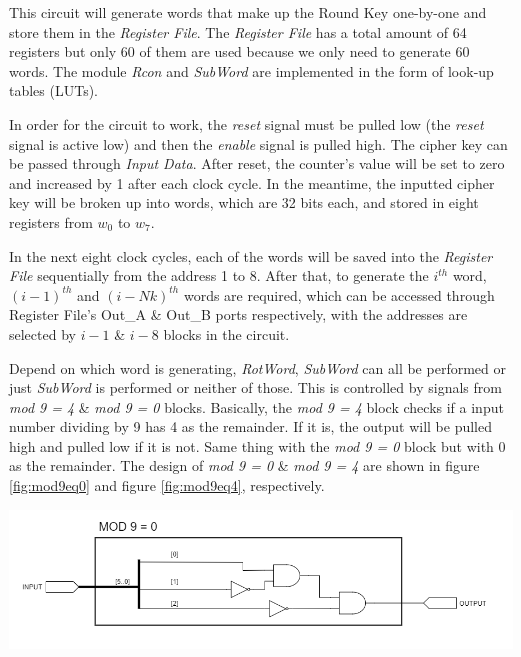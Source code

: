 \documentclass[a4paper, 10pt]{article}
\newenvironment{Figure}
    {\par\medskip\noindent\minipage{\linewidth}}
    {\endminipage\par\medskip}
\begin{document}
\begin{multicols}{2}
            This circuit will generate words that make up the Round Key one-by-one and store them in the \textit{Register File}. The \textit{Register File} has a total amount of 64 registers but only 60 of them are used because we only need to generate 60 words. The module \textit{Rcon} and \textit{SubWord} are implemented in the form of look-up tables (LUTs).

            In order for the circuit to work, the \textit{reset} signal must be pulled low (the \textit{reset} signal is active low) and then the \textit{enable} signal is pulled high. The cipher key can be passed through \textit{Input Data}. After reset, the counter's value will be set to zero and increased by 1 after each clock cycle. In the meantime, the inputted cipher key will be broken up into words, which are 32 bits each, and stored in eight registers from $w_{0}$ to $w_{7}$.
            
            In the next eight clock cycles, each of the words will be saved into the \textit{Register File} sequentially from the address 1 to 8. After that, to generate the $i^{th}$ word, $(i-1)^{th}$ and $(i-Nk)^{th}$ words are required, which can be accessed through Register File's Out\_A \& Out\_B ports respectively, with the addresses are selected by $i-1$ \& $i-8$ blocks in the circuit.

            Depend on which word is generating, \textit{RotWord}, \textit{SubWord} can all be performed or just \textit{SubWord} is performed or neither of those. This is controlled by signals from \textit{mod 9 = 4} \& \textit{mod 9 = 0} blocks. Basically, the \textit{mod 9 = 4} block checks if a input number dividing by 9 has 4 as the remainder. If it is, the output will be pulled high and pulled low if it is not. Same thing with the \textit{mod 9 = 0} block but with 0 as the remainder. The design of \textit{mod 9 = 0} \& \textit{mod 9 = 4} are shown in figure \ref{fig:mod9eq0} and figure \ref{fig:mod9eq4}, respectively.
            
            \noindent
            \begin{Figure}
                \centering
                \includegraphics[width=\linewidth]{Mod9Eq0.png}
                \label{fig:mod9eq0}
            \end{Figure}


\end{multicols}
\end{document}

